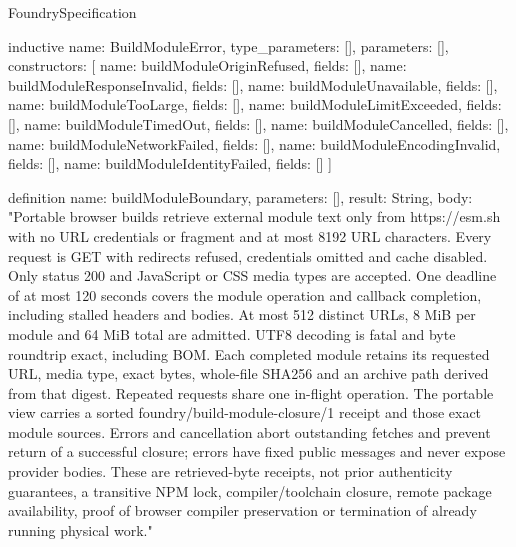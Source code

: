 \begin{lexlean}{FoundrySpecification}
\begin{semanticmodule}
inductive{
  name: BuildModuleError,
  type_parameters: [],
  parameters: [],
  constructors: [
    {name: buildModuleOriginRefused, fields: []},
    {name: buildModuleResponseInvalid, fields: []},
    {name: buildModuleUnavailable, fields: []},
    {name: buildModuleTooLarge, fields: []},
    {name: buildModuleLimitExceeded, fields: []},
    {name: buildModuleTimedOut, fields: []},
    {name: buildModuleCancelled, fields: []},
    {name: buildModuleNetworkFailed, fields: []},
    {name: buildModuleEncodingInvalid, fields: []},
    {name: buildModuleIdentityFailed, fields: []}
  ]
}

definition{
  name: buildModuleBoundary,
  parameters: [],
  result: String,
  body: "Portable browser builds retrieve external module text only from https://esm.sh with no URL credentials or fragment and at most 8192 URL characters. Every request is GET with redirects refused, credentials omitted and cache disabled. Only status 200 and JavaScript or CSS media types are accepted. One deadline of at most 120 seconds covers the module operation and callback completion, including stalled headers and bodies. At most 512 distinct URLs, 8 MiB per module and 64 MiB total are admitted. UTF8 decoding is fatal and byte roundtrip exact, including BOM. Each completed module retains its requested URL, media type, exact bytes, whole-file SHA256 and an archive path derived from that digest. Repeated requests share one in-flight operation. The portable view carries a sorted foundry/build-module-closure/1 receipt and those exact module sources. Errors and cancellation abort outstanding fetches and prevent return of a successful closure; errors have fixed public messages and never expose provider bodies. These are retrieved-byte receipts, not prior authenticity guarantees, a transitive NPM lock, compiler/toolchain closure, remote package availability, proof of browser compiler preservation or termination of already running physical work."
}
\end{semanticmodule}
\end{lexlean}
